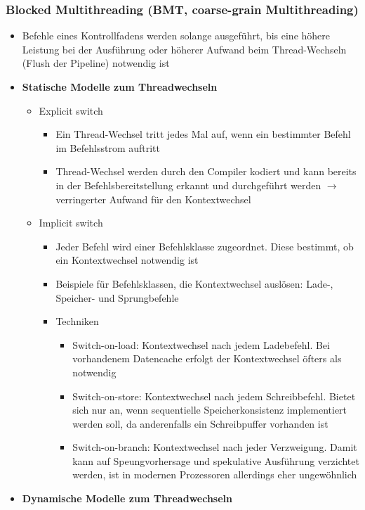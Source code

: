 \subsubsection{Blocked Multithreading (BMT, coarse-grain Multithreading)}
\begin{itemize}
	\item Befehle eines Kontrollfadens werden solange ausgeführt, bis eine höhere Leistung bei der Ausführung oder höherer Aufwand beim Thread-Wechseln (Flush der Pipeline) notwendig ist
	\item \textbf{Statische Modelle zum Threadwechseln}
	\begin{itemize}
		\item Explicit switch
		\begin{itemize}
			\item Ein Thread-Wechsel tritt jedes Mal auf, wenn ein bestimmter Befehl im Befehlsstrom auftritt
			\item Thread-Wechsel werden durch den Compiler kodiert und kann bereits in der Befehlsbereitstellung erkannt und durchgeführt werden \(\rightarrow\) verringerter Aufwand für den Kontextwechsel
		\end{itemize}
		\item Implicit switch
		\begin{itemize}
			\item Jeder Befehl wird einer Befehlsklasse zugeordnet. Diese bestimmt, ob ein Kontextwechsel notwendig ist
			\item Beispiele für Befehlsklassen, die Kontextwechsel auslösen: Lade-, Speicher- und Sprungbefehle
			\item Techniken
			\begin{itemize}
				\item Switch-on-load: Kontextwechsel nach jedem Ladebefehl. Bei vorhandenem Datencache erfolgt der Kontextwechsel öfters als notwendig
				\item Switch-on-store: Kontextwechsel nach jedem Schreibbefehl. Bietet sich nur an, wenn sequentielle Speicherkonsistenz implementiert werden soll, da anderenfalls ein Schreibpuffer vorhanden ist
				\item Switch-on-branch: Kontextwechsel nach jeder Verzweigung. Damit kann auf Speungvorhersage und spekulative Ausführung verzichtet werden, ist in modernen Prozessoren allerdings eher ungewöhnlich
			\end{itemize}
		\end{itemize}
	\end{itemize}
	\item \textbf{Dynamische Modelle zum Threadwechseln}

\end{itemize}

